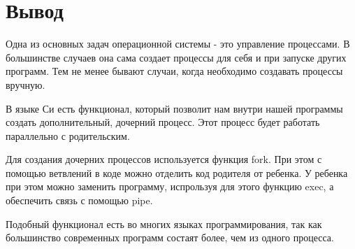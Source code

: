 \documentclass[pdf, unicode, 12pt, a4paper,oneside,fleqn]{article}
\begin{document}
\pagebreak

\section{Вывод}

Одна из основных задач операционной системы - это управление процессами.
В большинстве случаев она сама создает процессы для себя и при запуске других программ.
Тем не менее бывают случаи, когда необходимо создавать процессы вручную.

В языке Си есть функционал, который позволит нам внутри нашей программы создать
дополнительный, дочерний процесс. Этот процесс будет работать параллельно с родительским.

Для создания дочерних процессов используется функция fork. При этом с помощью ветвлений 
в коде можно отделить код родителя от ребенка. У ребенка при этом можно заменить программу,
испрользуя для этого функцию exec, а обеспечить связь с помощью pipe.

Подобный функционал есть во многих языках программирования, так как большинство современных программ состаят более, чем из одного процесса.
\end{document}
